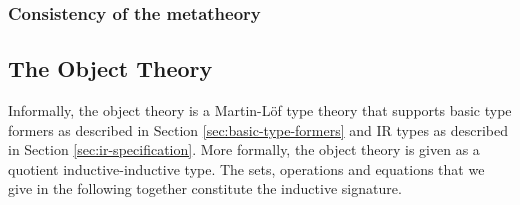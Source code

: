 \documentclass[acmsmall,screen,review,anonymous]{acmart}
\begin{document}
\subsubsection{Consistency of the metatheory}


\subsection{The Object Theory}\label{sec:object-theory}

Informally, the object theory is a Martin-Löf type theory that supports basic type formers as
described in Section \ref{sec:basic-type-formers} and IR types as described in Section
\ref{sec:ir-specification}. More formally, the object theory is given as a quotient
inductive-inductive type. The sets, operations and equations that we give in the following together
constitute the inductive signature.
\end{document}
